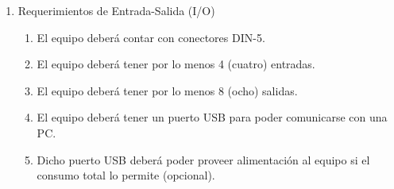 \documentclass[
11pt, %
]{charter}
\begin{document}
\begin{enumerate}
	\item Requerimientos de Entrada-Salida (I/O)
	\begin{enumerate}
		\item El equipo deberá contar con conectores DIN-5.
		\item El equipo deberá tener por lo menos 4 (cuatro) entradas.
		\item El equipo deberá tener por lo menos 8 (ocho) salidas.
		\item El equipo deberá tener un puerto USB para poder comunicarse con una PC.
		\item Dicho puerto USB deberá poder proveer alimentación al equipo si el consumo total lo permite (opcional).
	\end{enumerate}
	

\end{enumerate}
\end{document}
